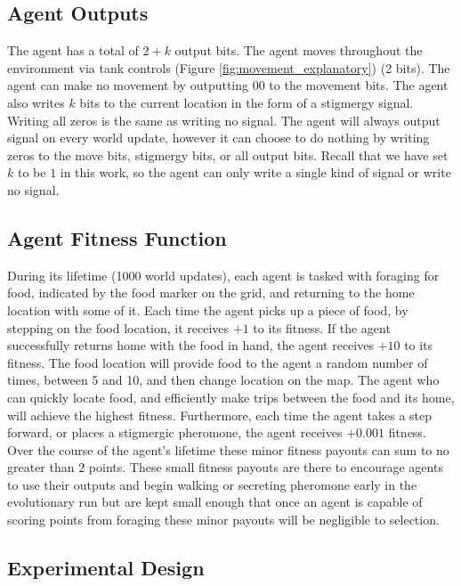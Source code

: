 

\subsection*{Agent Outputs}

The agent has a total of $2+k$ output bits. The agent moves throughout the environment via tank controls (Figure \ref{fig:movement_explanatory}) (2 bits). The agent can make no movement by outputting $00$ to the movement bits. The agent also writes $k$ bits to the current location in the form of a stigmergy signal. Writing all zeros is the same as writing no signal. The agent will always output signal on every world update, however it can choose to do nothing by writing zeros to the move bits, stigmergy bits, or all output bits. Recall that we have set $k$ to be $1$ in this work, so the agent can only write a single kind of signal or write no signal.



\subsection*{Agent Fitness Function}

During its lifetime (1000 world updates), each agent is tasked with foraging for food, indicated by the food marker on the grid, and returning to the home location with some of it. Each time the agent picks up a piece of food, by stepping on the food location, it receives $+1$ to its fitness. If the agent successfully returns home with the food in hand, the agent receives $+10$ to its fitness. The food location will provide food to the agent a random number of times, between 5 and 10, and then change location on the map. The agent who can quickly locate food, and efficiently make trips between the food and its home, will achieve the highest fitness. Furthermore, each time the agent takes a step forward, or places a stigmergic pheromone, the agent receives $+0.001$ fitness. Over the course of the agent's lifetime these minor fitness payouts can sum to no greater than $2$ points. These small fitness payouts are there to encourage agents to use their outputs and begin walking or secreting pheromone early in the evolutionary run but are kept small enough that once an agent is capable of scoring points from foraging these minor payouts will be negligible to selection.

\subsection {Experimental Design}

